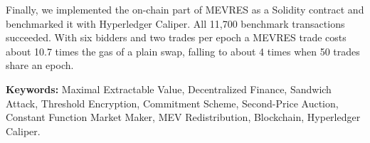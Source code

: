 Finally, we implemented the on-chain part of MEVRES as a Solidity contract and benchmarked it with Hyperledger Caliper. All 11{,}700 benchmark transactions succeeded. With six bidders and two trades per epoch a MEVRES trade costs about 10.7 times the gas of a plain swap, falling to about 4 times when 50 trades share an epoch.

\vspace{1em}
\noindent\textbf{Keywords:} Maximal Extractable Value, Decentralized Finance, Sandwich Attack, Threshold Encryption, Commitment Scheme, Second-Price Auction, Constant Function Market Maker, MEV Redistribution, Blockchain, Hyperledger Caliper.
